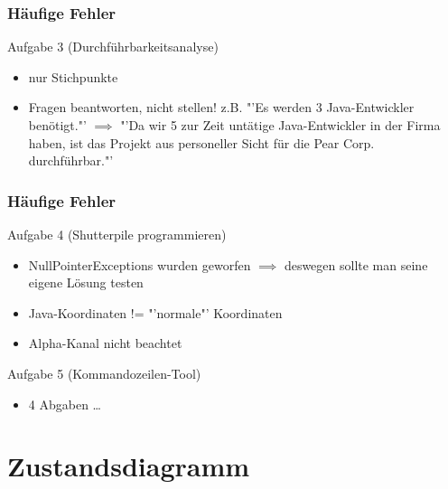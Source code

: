 \documentclass[18pt]{beamer}
\begin{document}
	\begin{frame}
		\frametitle{Häufige Fehler}
		\begin{block}{Aufgabe 3 (Durchführbarkeitsanalyse)}
			\begin{itemize}
				\item nur Stichpunkte
				\pause
				\item Fragen beantworten, nicht stellen!
				\linebreak z.B. "'Es werden 3 Java-Entwickler benötigt."' $\implies$
				"'Da wir 5 zur Zeit untätige Java-Entwickler in der Firma haben, ist das Projekt aus personeller Sicht für die Pear Corp. durchführbar."'
			\end{itemize}
		\end{block}
	\end{frame}

	\begin{frame}
		\frametitle{Häufige Fehler}
		\begin{block}{Aufgabe 4 (Shutterpile programmieren)}
			\begin{itemize}
				\item NullPointerExceptions wurden geworfen  \linebreak
				$\implies$ deswegen sollte man seine eigene Lösung testen
				\pause 
				\item Java-Koordinaten != "'normale"' Koordinaten
				\pause
				\item Alpha-Kanal nicht beachtet
			\end{itemize}
		\end{block}
	
	\begin{block}{Aufgabe 5 (Kommandozeilen-Tool)}
		\begin{itemize}
			\item 4 Abgaben \dots
		\end{itemize}
	\end{block}
\end{frame}

\section{Zustandsdiagramm}
\end{document}
